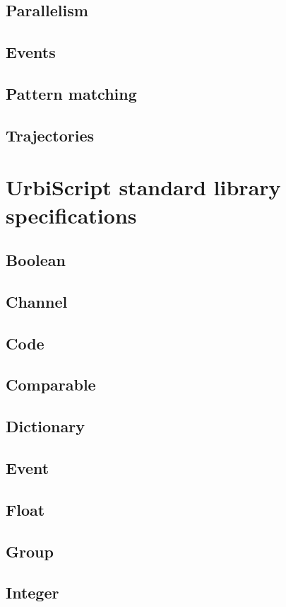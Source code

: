 \documentclass[openright,twoside,12pt]{report}
\newcommand{\us}{UrbiScript\xspace}
\begin{document}
\section{Parallelism}
\section{Events}
\section{Pattern matching}
\section{Trajectories}

\chapter{\us standard library specifications}

\section{Boolean}
\section{Channel}
\section{Code}
\section{Comparable}
\section{Dictionary}
\section{Event}
\section{Float}
\section{Group}
\section{Integer}
\end{document}
